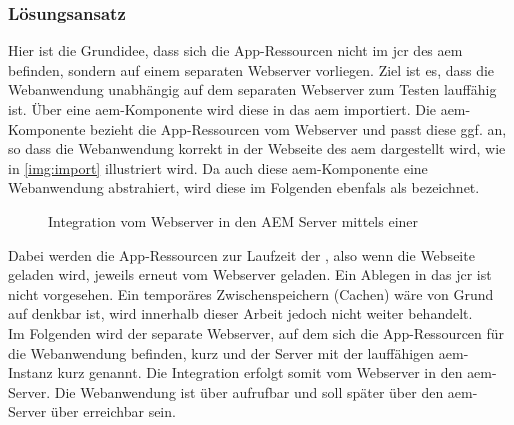 \subsubsection{Lösungsansatz }
\label{sec:ansatz-java}

Hier ist die Grundidee, dass sich die App-Ressourcen nicht im \ac{jcr} des \ac{aem} befinden, sondern auf einem separaten Webserver vorliegen. Ziel ist es, dass die Webanwendung unabhängig auf dem separaten Webserver zum Testen lauffähig ist. Über eine \ac{aem}-Komponente wird diese in das \ac{aem} importiert. Die \ac{aem}-Komponente bezieht die App-Ressourcen vom Webserver und passt diese ggf. an, so dass die Webanwendung korrekt in der Webseite des \ac{aem} dargestellt wird, wie in \autoref{img:import} illustriert wird. Da auch diese \ac{aem}-Komponente eine Webanwendung abstrahiert, wird diese im Folgenden ebenfals als \ajc bezeichnet.

\begin{figure}[H]
	\begin{center}
		
		\caption{Integration vom Webserver in den AEM Server mittels einer \ajc}
		\label{img:import}
	\end{center}
\end{figure}
Dabei werden die App-Ressourcen zur Laufzeit der \ajc, also wenn die Webseite geladen wird, jeweils erneut vom Webserver geladen. Ein Ablegen in das \ac{jcr} ist nicht vorgesehen. Ein temporäres Zwischenspeichern (Cachen) wäre von Grund auf denkbar ist, wird innerhalb dieser Arbeit jedoch nicht weiter behandelt. \\
Im Folgenden wird der separate Webserver, auf dem sich die App-Ressourcen für die Webanwendung befinden, kurz  und der Server mit der lauffähigen \ac{aem}-Instanz kurz  genannt. Die Integration erfolgt somit vom Webserver in den \ac{aem}-Server. Die Webanwendung ist über \serverB aufrufbar und soll später über den \ac{aem}-Server über \serverA erreichbar sein.\\

